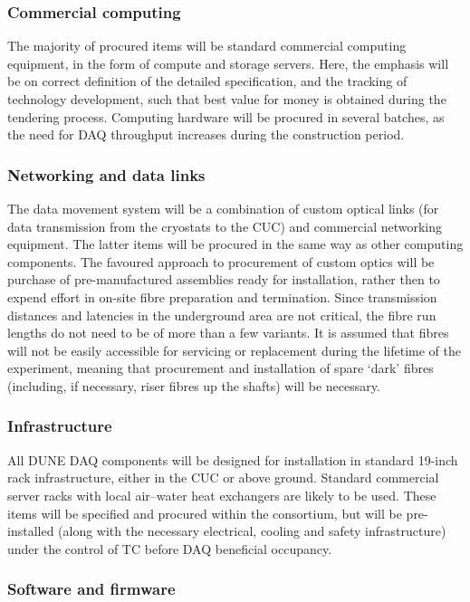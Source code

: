 \subsubsection{Commercial computing}

The majority of procured items will be standard commercial computing equipment, in the form of compute and storage servers. Here, the emphasis will be on correct definition of the detailed specification, and the tracking of technology development, such that best value for money is obtained during the tendering process. Computing hardware will be procured in several batches, as the need for DAQ throughput increases during the construction period. 

\subsubsection{Networking and data links}

The data movement system will be a combination of custom optical links (for data transmission from the cryostats to the CUC) and commercial networking equipment. The latter items will be procured in the same way as other computing components. The favoured approach to procurement of custom optics will be purchase of pre-manufactured assemblies ready for installation, rather then to expend effort in on-site fibre preparation and termination. Since transmission distances and latencies in the underground area are not critical, the fibre run lengths do not need to be of more than a few variants. It is assumed that fibres will not be easily accessible for servicing or replacement during the lifetime of the experiment, meaning that procurement and installation of spare `dark' fibres (including, if necessary, riser fibres up the shafts) will be necessary.

\subsubsection{Infrastructure}

All DUNE DAQ components will be designed for installation in standard 19-inch rack infrastructure, either in the CUC or above ground. Standard commercial server racks with local air--water heat exchangers are likely to be used. These items will be specified and procured within the consortium, but will be pre-installed (along with the necessary electrical, cooling and safety infrastructure) under the control of TC before DAQ beneficial occupancy.

\subsubsection{Software and firmware}

